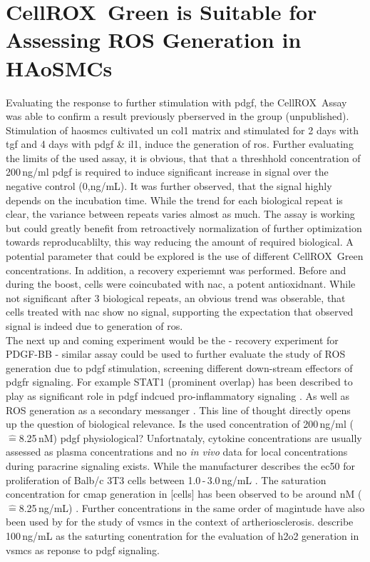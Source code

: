 \section{CellROX\texttrademark~Green is Suitable for Assessing ROS Generation in HAoSMCs}
Evaluating the response to further stimulation with \ac{pdgf}, the CellROX\texttrademark~Assay was able to confirm a result previously pberserved in the group (unpublished). Stimulation of \acp{haosmc} cultivated un \ac{col1} matrix and stimulated for 2 days with \ac{tgf} and 4 days with \ac{pdgf} \& \ac{il1}, induce the generation of \ac{ros}. Further evaluating the limits of the used assay, it is obvious, that that a threshhold concentration of 200\,ng/ml \ac{pdgf} is required to induce significant increase in signal over the negative control (0,ng/mL). It was further observed, that the signal highly depends on the incubation time. While the trend for each biological repeat is clear, the variance between repeats varies almost as much. The assay is working but could greatly benefit from retroactively normalization of further optimization towards reproducablilty, this way reducing the amount of required biological. A potential parameter that could be explored is the use of different CellROX\texttrademark~Green concentrations. In addition, a recovery experiemnt was performed. Before and during the boost, cells were coincubated with \ac{nac}, a potent antioxidnant. While not significant after 3 biological repeats, an obvious trend was obserable, that cells treated with \ac{nac} show no signal, supporting the expectation that observed signal is indeed due to generation of \ac{ros}.\\
The next up and coming experiment would be the
- recovery experiment for PDGF-BB
- similar assay could be used to further evaluate the study of ROS generation due to \ac{pdgf} stimulation, screening different down-stream effectors of \ac{pdgfr} signaling. For example STAT1 (prominent overlap) has been described to play as significant role in \ac{pdgf} indcued pro-inflammatory signaling \cite{find source in hePDGFRvSignallingRegulates2015}. As well as ROS generation as a secondary messanger \cite{}.
This line of thought directly opens up the question of biological relevance. Is the used concentration of 200\,ng/ml ($\widehat{=}$8.25\,nM) \ac{pdgf} physiological? Unfortnataly, cytokine concentrations are usually assessed as plasma concentrations and no \textit{in vivo} data for local concentrations during paracrine signaling exists. While the manufacturer describes the \ac{ec50} for proliferation of Balb/c 3T3 cells between 1.0\,-\,3.0\,ng/mL \cite{}. The saturation concentration for \ac{cmap} generation in [cells] has been observed to be around nM ($\widehat{=}$8.25\,ng/mL) \cite{}. Further concentrations in the same order of magintude have also been used by \textcite{} for the study of \acp{vsmc} in the context of artheriosclerosis. \textcite{} describe 100\,ng/mL as the saturting conentration for the evaluation of \ac{h2o2} generation in \acp{vsmc} as reponse to \ac{pdgf} signaling.

